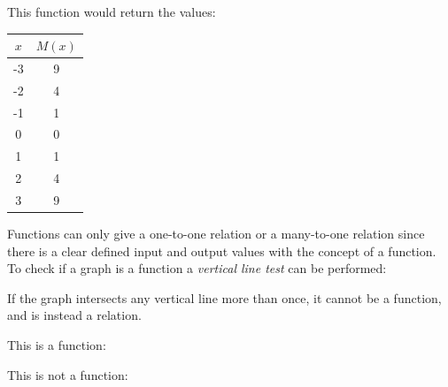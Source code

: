 \documentclass{book}
\begin{document}
This function would return the values:
\begin{center}
	\begin{tabular}{c|c}
		$x$ & $M(x)$ \\ \hline
		-3  & 9      \\
		-2  & 4      \\
		-1  & 1      \\
		0   & 0      \\
		1   & 1      \\
		2   & 4      \\
		3   & 9
	\end{tabular}
\end{center}
\begin{center}
\end{center}

Functions can only give a one-to-one relation or a many-to-one relation since there is a clear defined input and output values with the concept of a function.  To check if a graph is a function a \emph{vertical line test} can be performed:
\begin{center}
	If the graph intersects any vertical line more than once, it cannot be a function, and is instead a relation.
\end{center}
\begin{center}
	This is a function:
	\begin{center}
	\end{center}
\end{center}
\begin{center}
	This is not a function:
	\begin{center}
	\end{center}
\end{center}
\end{document}
